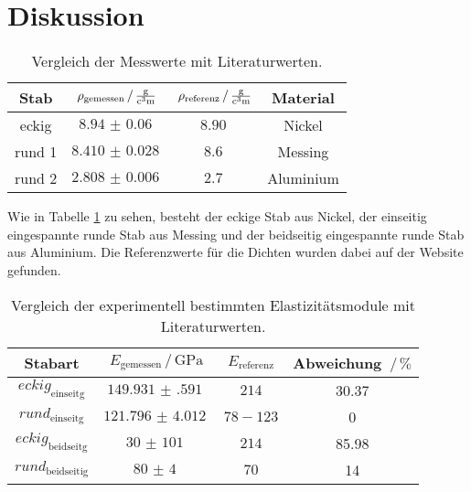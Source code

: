 \section{Diskussion}
\label{sec:Diskussion}

\begin{table}
\centering
\caption{Vergleich der Messwerte mit Literaturwerten.}
\begin{tabular}{cccc}
    \toprule
    Stab & $\rho _\text{gemessen} \,/\, \si{\frac{\gram}{\cubic\centi\meter}}$ & $\rho _\text{referenz} \,/\, \si{\frac{\gram}{\cubic\centi\meter}}$  & Material \\
    \midrule
    eckig & $\SI{8.94(6)}{}$ & $\SI{8.90}{}$ & Nickel \\
    rund 1 & $\SI{8.410(28)}{}$ & $\SI{8.6}{}$ & Messing \\
    rund 2 & $\SI{2.808(6)}{}$ & $\SI{2.7}{}$& Aluminium \\
    \bottomrule
\end{tabular}
\label{tab:refferenz}
\end{table}

Wie in Tabelle \ref{tab:refferenz} zu sehen, besteht der eckige Stab aus Nickel, der einseitig eingespannte runde Stab aus Messing und der beidseitig eingespannte runde Stab aus Aluminium.
Die Referenzwerte für die Dichten wurden dabei auf der Website \cite{technik} gefunden.

\begin{table}
\centering
\caption{Vergleich der experimentell bestimmten Elastizitätsmodule mit Literaturwerten.}
\begin{tabular}{cccc}
    \toprule
    Stabart & $E_\text{gemessen}\,/\, \si{\giga\pascal}$ & $E_\text{referenz}$ & Abweichung $\,/\, \%$ \\
    \midrule
    $eckig_\text{einseitg}$ & $\SI{149.931(591)}{}$ & $214$ \cite{nickel} & 30.37\\
    $rund_\text{einseitg}$ & $ \SI{121.796(4012)}{}$ & $78-123$ \cite{messing} & 0 \\
    $eckig_\text{beidseitg}$ & $\SI{30(101)}{}$ & $214$ \cite{nickel}& 85.98 \\
    $rund_\text{beidseitig}$ & $\SI{80(4)}{}$ & $70$ \cite{nickel} & 14 \\
\end{tabular}
\label{tab:ele}
\end{table}

